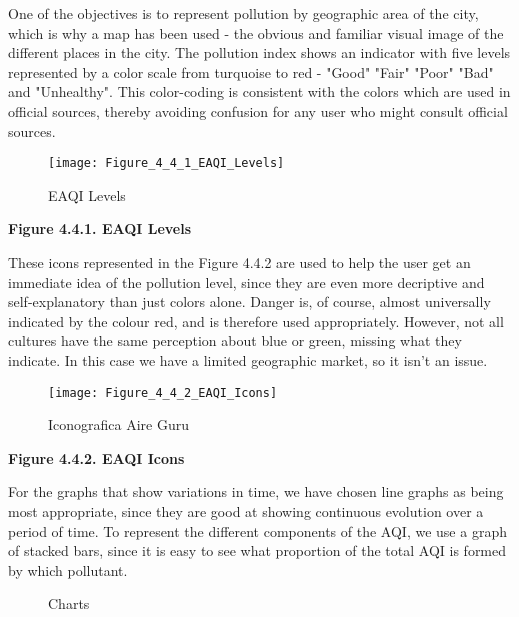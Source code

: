 One of the objectives is to represent pollution by geographic area of the city, which is why a map has been used - the 
obvious and familiar visual image of the different places in the city. The pollution index shows an indicator with 
five levels represented by a color scale from turquoise to red - "Good" "Fair" "Poor" "Bad" and "Unhealthy". 
This color-coding is consistent with the colors which are used in official sources, thereby avoiding confusion for any 
user who might consult official sources.

\begin{figure}[ht]
    \centering
    \texttt{[image: Figure\_4\_4\_1\_EAQI\_Levels]}
    \caption{EAQI Levels}
\end{figure}
\begin{center}
    \bf{        
    Figure 4.4.1. EAQI Levels}
\end{center}

These icons represented in the Figure 4.4.2 are used to help the user get an immediate idea of the pollution level, since they are even more
decriptive and self-explanatory than just colors alone. Danger is, of course, almost universally indicated by 
the colour red, and is therefore used appropriately. However, not all cultures have the same perception about
blue or green, missing what they indicate. In this case we have a limited geographic market, so it isn't an issue.\\

\begin{figure}[ht]
    \centering
    \texttt{[image: Figure\_4\_4\_2\_EAQI\_Icons]}
    \caption{Iconografica Aire Guru}
\end{figure}

\begin{center}
    \bf{        
    Figure 4.4.2. EAQI Icons}
\end{center}
For the graphs that show variations in time, we have chosen line graphs as being most appropriate,
since they are good at showing continuous evolution over a period of time. To represent the different components of the AQI, we use a
graph of stacked bars, since it is easy to see what proportion of the total AQI is formed by which pollutant. \\

\begin{figure}[ht]
    \centering
        \hfill
    \caption{Charts}
\end{figure}

